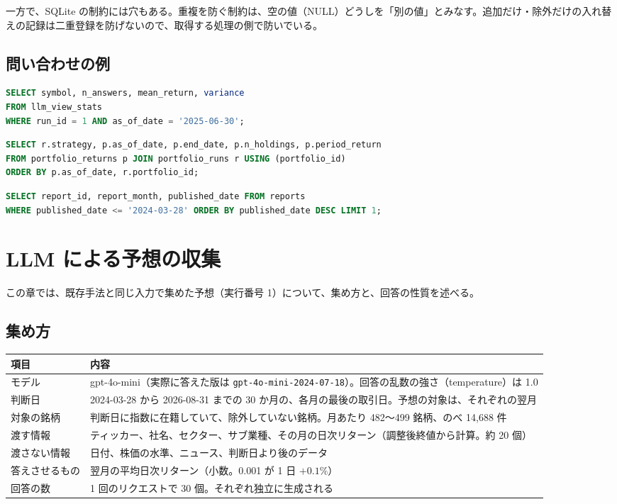 \documentclass[xelatex,ja=standard,jafont=hiragino-pron,a4paper,10pt]{bxjsreport}
\newcommand{\code}[1]{\texttt{#1}}
\begin{document}
一方で、SQLite の制約には穴もある。重複を防ぐ制約は、空の値（NULL）どうしを「別の値」とみなす。追加だけ・除外だけの入れ替えの記録は二重登録を防げないので、取得する処理の側で防いでいる。

\section{問い合わせの例}

\begin{lstlisting}[language=SQL,caption={ある判断日の Black-Litterman の入力（ビューと不確かさ）}]
SELECT symbol, n_answers, mean_return, variance
FROM llm_view_stats
WHERE run_id = 1 AND as_of_date = '2025-06-30';
\end{lstlisting}

\begin{lstlisting}[language=SQL,caption={戦略ごとの月次リターン}]
SELECT r.strategy, p.as_of_date, p.end_date, p.n_holdings, p.period_return
FROM portfolio_returns p JOIN portfolio_runs r USING (portfolio_id)
ORDER BY p.as_of_date, r.portfolio_id;
\end{lstlisting}

\begin{lstlisting}[language=SQL,caption={判断日までに公表されていた最新のレポート}]
SELECT report_id, report_month, published_date FROM reports
WHERE published_date <= '2024-03-28' ORDER BY published_date DESC LIMIT 1;
\end{lstlisting}

\chapter{LLM による予想の収集}\label{ch:views}

この章では、既存手法と同じ入力で集めた予想（実行番号 1）について、集め方と、回答の性質を述べる。

\section{集め方}

\begin{longtable}{p{3.60cm}p{10.80cm}}
\toprule
\textbf{項目} & \textbf{内容} \\
\midrule
\endfirsthead
\bottomrule
\endfoot
モデル & gpt-4o-mini（実際に答えた版は \code{gpt-4o-mini-2024-07-18}）。回答の乱数の強さ（temperature）は 1.0 \\
判断日 & 2024-03-28 から 2026-08-31 までの 30 か月の、各月の最後の取引日。予想の対象は、それぞれの翌月 \\
対象の銘柄 & 判断日に指数に在籍していて、除外していない銘柄。月あたり 482〜499 銘柄、のべ 14,688 件 \\
渡す情報 & ティッカー、社名、セクター、サブ業種、その月の日次リターン（調整後終値から計算。約 20 個） \\
渡さない情報 & 日付、株価の水準、ニュース、判断日より後のデータ \\
答えさせるもの & 翌月の平均日次リターン（小数。0.001 が 1 日 $+0.1\%$） \\
回答の数 & 1 回のリクエストで 30 個。それぞれ独立に生成される \\
\end{longtable}
\end{document}
